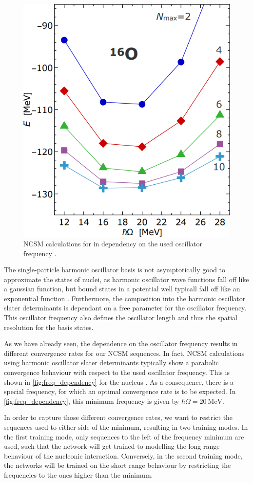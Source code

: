\begin{figure}
  \includegraphics[width=.5\textwidth]{media/freq_filter.png}
  \caption{NCSM calculations for  in dependency on the used oscillator frequency \cite{sommerschule}.}
  \label{fig:freq_dependency}
\end{figure}
The single-particle harmonic oscillator basis is not asymptotically good to approximate the states of nuclei, as harmonic oscillator wave functions fall off like a gaussian function, but bound states in a potential well typicall fall off like an exponential function \cite{sommerschule}. Furthermore, the composition into the harmonic oscillator slater determinants is dependant on a free parameter for the oscillator frequency. This oscillator frequency also defines the oscillator length and thus the spatial resolution for the basis states.

As we have already seen, the dependence on the oscillator frequency results in different convergence rates for our NCSM sequences. In fact, NCSM calculations using harmonic oscillator slater determinants typically show a parabolic convergence behaviour with respect to the used oscillator frequency. This is shown in \autoref{fig:freq_dependency} for the nucleus . As a consequence, there is a special frequency, for which an optimal convergence rate is to be expected. In \autoref{fig:freq_dependency}, this minimum frequency is given by $\hbar \Omega = \SI{20}{\mega\electronvolt}$.

In order to capture those different convergence rates, we want to restrict the sequences used to either side of the minimum, resulting in two training modes. In the first training mode, only sequences to the left of the frequency minimum are used, such that the network will get trained to modelling the long range behaviour of the nucleonic interaction. Conversely, in the second training mode, the networks will be trained on the short range behaviour by restricting the frequencies to the ones higher than the minimum.

